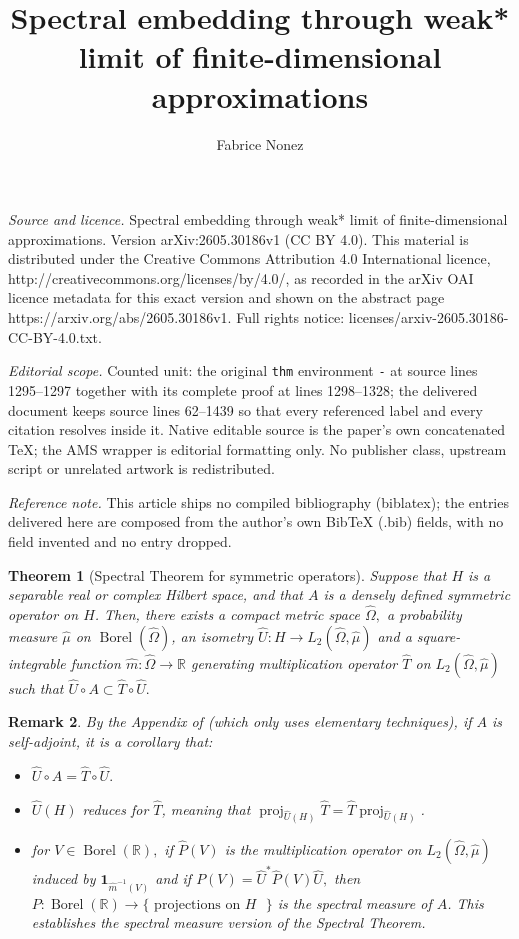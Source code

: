 \documentclass[10pt,a4paper]{amsart}
\newtheorem{thm}{Theorem}[section]
\newtheorem{remark}[thm]{Remark}
\def \Proj{\operatorname{proj}}
\def \Borel{\operatorname{Borel}}
\def \HOM{\hat{\Omega}}
\def \HMU{\hat{\mu}}
\def \HU{\hat{U}}
\def \HT{\hat{T}}
\def \Hm{\hat{m}}
\begin{document}
\title[Spectral embedding through weak* limit of finite-dimensional]{Spectral embedding through weak* limit of finite-dimensional approximations}
\author{Fabrice Nonez}
\date{}
\maketitle
\noindent\emph{Source and licence.} Spectral embedding through weak* limit of finite-dimensional approximations. Version arXiv:2605.30186v1 (CC BY 4.0). This material is distributed under the Creative Commons Attribution 4.0 International licence, http://creativecommons.org/licenses/by/4.0/, as recorded in the arXiv OAI licence metadata for this exact version and shown on the abstract page https://arxiv.org/abs/2605.30186v1. Full rights notice: licenses/arxiv-2605.30186-CC-BY-4.0.txt.\par\smallskip
\noindent\textit{Editorial scope.} Counted unit: the original \texttt{thm} environment \texttt{-} at source lines 1295--1297 together with its complete proof at lines 1298--1328; the delivered document keeps source lines 62--1439 so that every referenced label and every citation resolves inside it. Native editable source is the paper's own concatenated TeX; the AMS wrapper is editorial formatting only. No publisher class, upstream script or unrelated artwork is redistributed.
\par\smallskip\noindent\textit{Reference note.} This article ships no compiled bibliography (biblatex); the entries delivered here are composed from the author's own BibTeX (.bib) fields, with no field invented and no entry dropped.
\begin{thm}[Spectral Theorem for symmetric operators]\label{theorem_spectral_embedding}
	Suppose that $H$ is a separable real or complex Hilbert space, and that $A$ is a densely defined symmetric operator on $H$. Then, there exists a compact metric space $\HOM,$ a probability measure $\HMU$ on $\Borel(\HOM)$, an isometry $\HU:H\rightarrow L_2(\HOM,\HMU)$ and a square-integrable function $\Hm:\HOM\rightarrow\mathbb{R}$ generating multiplication operator $\HT$ on $L_2(\HOM,\HMU)$ such that $\HU\circ A \subset \HT\circ \HU.$
\end{thm}
\begin{remark}
	By the Appendix of \cite{nonez2024spectralequivalencesnonstandardsamplings} (which only uses elementary techniques), if $A$ is self-adjoint, it is a corollary that:
	\begin{itemize}
		\item $\HU\circ A = \HT\circ \HU.$ 
		\item $\HU(H)$ reduces for $\HT$, meaning that $\Proj_{\HU(H)} \HT=\HT\Proj_{\HU(H)}$.
		\item for $V\in\operatorname{Borel}(\mathbb{R}),$ if $\hat{P}(V)$ is the multiplication operator on $L_2(\HOM,\HMU)$ induced by $\mathbf{1}_{\Hm^{-1}(V)}$ and if $P(V)=\HU^* \hat{P}(V) \HU,$ then $P:\operatorname{Borel}(\mathbb{R})\rightarrow\{\text{ projections on $H$ } \}$ is the spectral measure of $A$. This establishes the spectral measure version of the Spectral Theorem.
	\end{itemize}
\end{remark}
\end{document}
